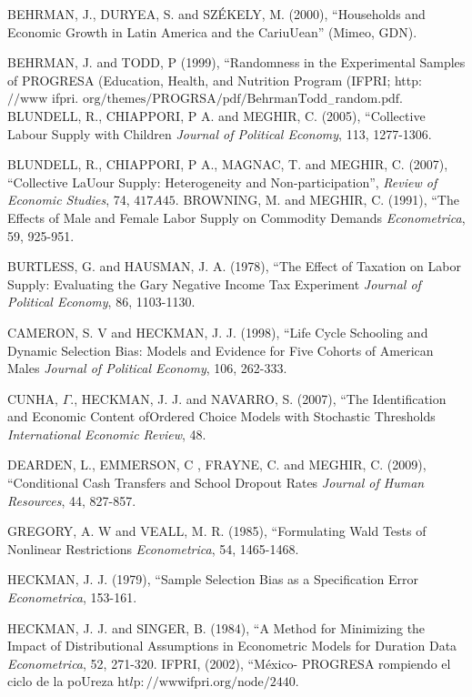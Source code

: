 \documentclass{handoutForSolutions}
\begin{document}
BEHRMAN, J., DURYEA, S. and SZ\'{E}KELY, M. (2000), ``Households and Economic Growth in Latin America and the CariuUean'' (Mimeo, GDN).

BEHRMAN, J. and TODD, $\mathrm{P}$ (1999), ``Randomness in the Experimental Samples of PROGRESA (Education, Health, and Nutrition Program (IFPRI; http: $//\mathrm{w}\mathrm{w}\mathrm{w}$ ifpri. $\mathrm{o}\mathrm{r}\mathrm{g}/\mathrm{t}\mathrm{h}\mathrm{e}\mathrm{m}\mathrm{e}\mathrm{s}/\mathrm{P}\mathrm{R}\mathrm{O}\mathrm{G}\mathrm{R}\mathrm{S}\mathrm{A}/\mathrm{p}\mathrm{d}\mathrm{f}/\mathrm{B}\mathrm{e}\mathrm{h}\mathrm{r}\mathrm{m}\mathrm{a}\mathrm{n}\mathrm{T}\mathrm{o}\mathrm{d}\mathrm{d}_{-}$random.$\mathrm{p}\mathrm{d}\mathrm{f}.$
BLUNDELL, R., CHIAPPORI, $\mathrm{P}$ A. and MEGHIR, C. (2005), ``Collective Labour Supply with Children {\it Journal of Political Economy}, 113, 1277-1306.

BLUNDELL, R., CHIAPPORI, $\mathrm{P}$ A., MAGNAC, T. and MEGHIR, C. (2007), ``Collective LaUour Supply: Heterogeneity and Non-participation'', {\it Review of Economic Studies}, 74, $417A45.$
BROWNING, M. and MEGHIR, C. (1991), ``The Effects of Male and Female Labor Supply on Commodity Demands {\it Econometrica}, 59, 925-951.

BURTLESS, G. and HAUSMAN, J. A. (1978), ``The Effect of Taxation on Labor Supply: Evaluating the Gary Negative Income Tax Experiment {\it Journal of Political Economy}, 86, 1103-1130.

CAMERON, S. V and HECKMAN, J. J. (1998), ``Life Cycle Schooling and Dynamic Selection Bias: Models and Evidence for Five Cohorts of American Males {\it Journal of Political Economy}, 106, 262-333.

CUNHA, $\Gamma.$, HECKMAN, J. J. and NAVARRO, S. (2007), ``The Identification and Economic Content ofOrdered Choice Models with Stochastic Thresholds {\it International Economic Review}, 48.

DEARDEN, L., EMMERSON, $\mathrm{C}$ , FRAYNE, C. and MEGHIR, C. (2009), ``Conditional Cash Transfers and School Dropout Rates {\it Journal of Human Resources}, 44, 827-857.

GREGORY, A. $\mathrm{W}$ and VEALL, M. R. (1985), ``Formulating Wald Tests of Nonlinear Restrictions {\it Econometrica}, 54, 1465-1468.

HECKMAN, J. J. (1979), ``Sample Selection Bias as a Specification Error {\it Econometrica}, 153-161.

HECKMAN, J. J. and SINGER, B. (1984), ``A Method for Minimizing the Impact of Distributional Assumptions in Econometric Models for Duration Data {\it Econometrica}, 52, 271-320.
IFPRI, (2002), ``M\'{e}xico- PROGRESA rompiendo el ciclo de la poUreza $\mathrm{h}\mathrm{t}l\mathrm{p}://\mathrm{w}\mathrm{w}\mathrm{w}\mathrm{i}$fpri.$\mathrm{o}\mathrm{r}\mathrm{g}/\mathrm{n}\mathrm{o}\mathrm{d}\mathrm{e}/2440.$
\end{document}
